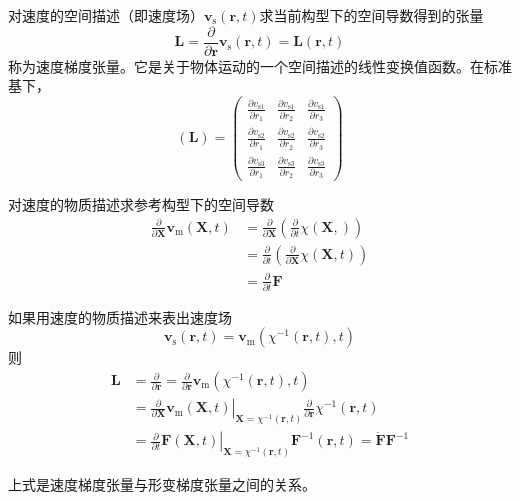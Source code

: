 \documentclass[main.tex]{subfiles}
\begin{document}
对速度的空间描述（即速度场）$\mathbf{v}_\mathrm{s}\left(\mathbf{r},t\right)$求当前构型下的空间导数得到的张量
\[\mathbf{L}=\frac{\partial}{\partial\mathbf{r}}\mathbf{v}_\mathrm{s}\left(\mathbf{r},t\right)=\mathbf{L}\left(\mathbf{r},t\right)\]
称为速度梯度张量。它是关于物体运动的一个空间描述的线性变换值函数。在标准基下，
\[\left(\mathbf{L}\right)=\left(\begin{array}{ccc}\frac{\partial v_{\mathrm{s}1}}{\partial r_1}&\frac{\partial v_{\mathrm{s}1}}{\partial r_2}&\frac{\partial v_{\mathrm{s}1}}{\partial r_3}\\\frac{\partial v_{\mathrm{s}2}}{\partial r_1}&\frac{\partial v_{\mathrm{s}2}}{\partial r_2}&\frac{\partial v_{\mathrm{s}2}}{\partial r_3}\\\frac{\partial v_{\mathrm{s}3}}{\partial r_1}&\frac{\partial v_{\mathrm{s}3}}{\partial r_2}&\frac{\partial v_{\mathrm{s}3}}{\partial r_3}\end{array}\right)\]

对速度的物质描述求参考构型下的空间导数
\begin{align*}\frac{\partial}{\partial\mathbf{X}}\mathbf{v}_\mathrm{m}\left(\mathbf{X},t\right)&=\frac{\partial}{\partial \mathbf{X}}\left(\frac{\partial}{\partial t}\chi\left(\mathbf{X},\right)\right)\\
&=\frac{\partial}{\partial t}\left(\frac{\partial}{\partial\mathbf{X}}\chi\left(\mathbf{X},t\right)\right)\\
&=\frac{\partial}{\partial t}\mathbf{F}
\end{align*}

如果用速度的物质描述来表出速度场
\[\mathbf{v}_\mathrm{s}\left(\mathbf{r},t\right)=\mathbf{v}_\mathrm{m}\left(\chi^{-1}\left(\mathbf{r},t\right),t\right)\]
则
\begin{align*}
    \mathbf{L}&=\frac{\partial}{\partial\mathbf{r}}=\frac{\partial}{\partial \mathbf{r}}\mathbf{v}_\mathrm{m}\left(\chi^{-1}\left(\mathbf{r},t\right),t\right)\\
    &=\left.\frac{\partial}{\partial\mathbf{X}}\mathbf{v}_\mathrm{m}\left(\mathbf{X},t\right)\right|_{\mathbf{X}=\chi^{-1}\left(\mathbf{r},t\right)}\frac{\partial}{\partial \mathbf{r}}\chi^{-1}\left(\mathbf{r},t\right)\\
    &=\left.\frac{\partial}{\partial t}\mathbf{F}\left(\mathbf{X},t\right)\right|_{\mathbf{X}=\chi^{-1}\left(\mathbf{r},t\right)}\mathbf{F}^{-1}\left(\mathbf{r},t\right)=\dot{\mathbf{F}}\mathbf{F}^{-1}
\end{align*}

上式是速度梯度张量与形变梯度张量之间的关系。
\end{document}
